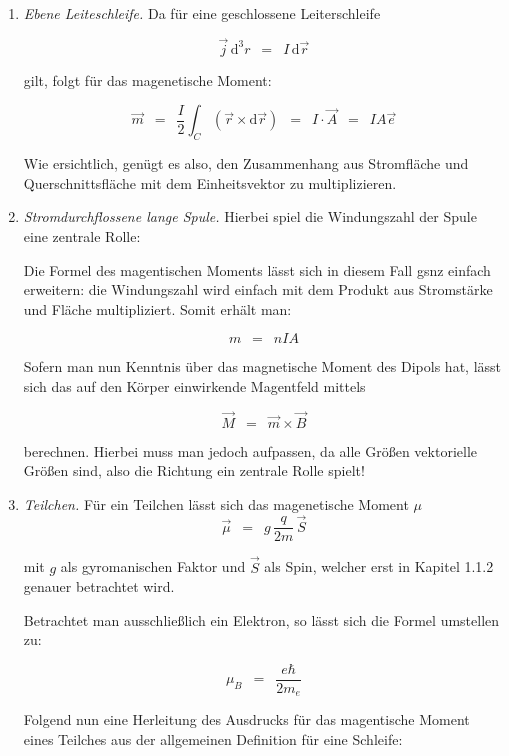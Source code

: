 \documentclass{article}
\newcommand{\widespace}{\enspace}
\newcommand{\wideeq}{\widespace = \widespace}
\begin{document}
\begin{enumerate}
    \item \textit{Ebene Leiteschleife.} \quad Da für eine geschlossene Leiterschleife
    
    \[
        \vec{j} \, \mathrm{d}^3 r \wideeq I \, \mathrm{d} \vec{r}
    \]
    
    gilt, folgt für das magenetische Moment:

    \[
        \vec{m}
        \wideeq \frac{I}{2} \int_C \left( \vec{r} \times \mathrm{d} \vec{r} \right)
        \wideeq I \cdot \vec{A}
        \wideeq I A \vec{e}
    \]

    Wie ersichtlich, genügt es also, den Zusammenhang aus Stromfläche und Querschnittsfläche mit dem Einheitsvektor zu multiplizieren.

    \item \textit{Stromdurchflossene lange Spule.} \quad
    Hierbei spiel die Windungszahl der Spule eine zentrale Rolle:

    Die Formel des magentischen Moments lässt sich in diesem Fall gsnz einfach erweitern: die Windungszahl wird einfach mit dem Produkt aus Stromstärke und Fläche multipliziert. Somit erhält man:

    \[
        m \wideeq nIA
    \]

    Sofern man nun Kenntnis über das magnetische Moment des Dipols hat, lässt sich das auf den Körper einwirkende Magentfeld mittels

    \[
        \vec{M} \wideeq \vec{m} \times \vec{B}
    \]

    berechnen. Hierbei muss man jedoch aufpassen, da alle Größen vektorielle Größen sind, also die Richtung ein zentrale Rolle spielt!

    \item \textit{Teilchen.} \quad
    Für ein Teilchen lässt sich das magenetische Moment $\mu$
    \[
        \vec{\mu} \wideeq g \, \frac{q}{2m} \, \vec{S}
    \]

     mit $g$ als gyromanischen Faktor und $\vec{S}$ als Spin, welcher erst in Kapitel 1.1.2 genauer betrachtet wird.

    Betrachtet man ausschließlich ein Elektron, so lässt sich die Formel umstellen zu:

    \[
        \mu_B \wideeq \frac{e\hbar}{2m_e}
    \]

    Folgend nun eine Herleitung des Ausdrucks für das magentische Moment eines Teilches aus der allgemeinen Definition für eine Schleife:


\end{enumerate}
\end{document}

